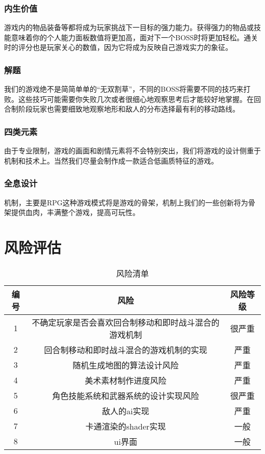 \documentclass{article}
\begin{document}
\subsubsection{内生价值}
游戏内的物品装备等都将成为玩家挑战下一目标的强力能力。获得强力的物品或技能意味着你的个人能力面板数值将更加高，面对下一个BOSS时将更加轻松。通关时的评分也是玩家关心的数值，因为它将成为反映自己游戏实力的象征。
\subsubsection{解题}
我们的游戏绝不是简简单单的“无双割草”，不同的BOSS将需要不同的技巧来打败。这些技巧可能需要你失败几次或者很细心地观察思考后才能较好地掌握。在回合制阶段玩家也需要细致地观察地形和敌人的分布选择最有利的移动路线。
\subsubsection{四类元素}
由于专业限制，游戏的画面和剧情元素将不会特别突出，我们将游戏的设计侧重于机制和技术上。当然我们尽量会制作成一款适合低画质特征的游戏。
\subsubsection{全息设计}
机制，主要是RPG这种游戏模式将是游戏的骨架，机制上我们的一些创新将为骨架提供血肉，丰满整个游戏，提高可玩性。
\newpage
\section{风险评估}
\begin{table}[htbp]
\centering
\caption{风险清单}
\begin{tabular}{|c|c|c|}
	\hline
	编号 & 风险 & 风险等级 \\
	\hline
	1 & 不确定玩家是否会喜欢回合制移动和即时战斗混合的游戏机制 & 很严重 \\
	\hline
	2 & 回合制移动和即时战斗混合的游戏机制的实现 & 严重 \\
	\hline
	3 & 随机生成地图的算法设计风险 & 严重 \\
	\hline
	4 & 美术素材制作进度风险 & 严重 \\
	\hline
	5 & 角色技能系统和武器系统的设计实现风险 & 很严重 \\
	\hline
	6 & 敌人的ai实现 & 严重 \\
	\hline
	7 & 卡通渲染的shader实现 & 一般 \\
	\hline
	8 & ui界面 & 一般 \\
	\hline
\end{tabular}
\end{table}
\end{document}
